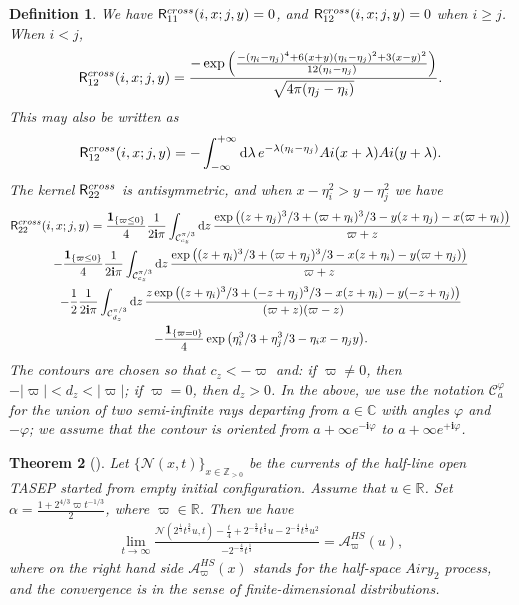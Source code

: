 \documentclass[12pt,a4paper]{amsart}
\newtheorem{theorem}{Theorem} %
\newtheorem{definition}[theorem]{Definition}
\theoremstyle{remark}
\numberwithin{equation}{section} \numberwithin{theorem}{section}
\newcommand{\Rkernel}{\mathsf{R}}
\newcommand{\I}{\ensuremath{\mathbf{i}}}
\def \Ai {{\rm Ai}}
\begin{document}
\begin{definition}
We have
$\Rkernel_{11}^{\rm cross}(i,x;j,y)=0$, and
$\Rkernel_{12}^{\rm cross}(i,x;j,y)=0$ when $i\geq j$.
When $i<j$,
$$
\Rkernel_{12}^{\rm cross}(i,x;j,y)
=
\frac{-\exp\left(
\frac{
-(\eta_i-\eta_j)^4
+6(x+y)(\eta_i-\eta_j)^2
+3(x-y)^2
}{
12(\eta_i-\eta_j)
}
\right)}
{\sqrt{4\pi(\eta_j-\eta_i)}}.
$$
This may also be written as
$$
\Rkernel_{12}^{\rm cross}(i,x;j,y)
=
-\int_{-\infty}^{+\infty}
\mathrm{d}\lambda\,
e^{-\lambda(\eta_i-\eta_j)}
\Ai(x+\lambda)\Ai(y+\lambda).
$$
The kernel $\Rkernel_{22}^{\rm cross}$ is antisymmetric, and when
$x-\eta_i^2>y-\eta_j^2$ we have
\begin{multline*}
\Rkernel_{22}^{\rm cross}(i,x;j,y)
=
\frac{\mathbf{1}_{\{\varpi\leq 0\}}}{4}
\frac{1}{2\I\pi}
\int_{\mathcal{C}_{c_z}^{\pi/3}}\mathrm{d}z\,
\frac{
\exp\big(
(z+\eta_j)^3/3+(\varpi+\eta_i)^3/3
-y(z+\eta_j)-x(\varpi+\eta_i)
\big)}
{\varpi+z}
\\
-\frac{\mathbf{1}_{\{\varpi\leq 0\}}}{4}
\frac{1}{2\I\pi}
\int_{\mathcal{C}_{c_z}^{\pi/3}}\mathrm{d}z\,
\frac{
\exp\big(
(z+\eta_i)^3/3+(\varpi+\eta_j)^3/3
-x(z+\eta_i)-y(\varpi+\eta_j)
\big)}
{\varpi+z}
\\
-\frac{1}{2}
\frac{1}{2\I\pi}
\int_{\mathcal{C}_{d_z}^{\pi/3}}\mathrm{d}z\,
\frac{
z\exp\big(
(z+\eta_i)^3/3+(-z+\eta_j)^3/3
-x(z+\eta_i)-y(-z+\eta_j)
\big)}
{(\varpi+z)(\varpi-z)}
\\
-\frac{\mathbf{1}_{\{\varpi=0\}}}{4}
\exp\big(
\eta_i^3/3+\eta_j^3/3-\eta_i x-\eta_j y
\big).
\end{multline*}
The contours are chosen so that $c_z<-\varpi$ and:
if $\varpi\neq0$, then
$-|\varpi|<d_z<|\varpi|$; if $\varpi=0$, then $d_z>0$.
In the above, we use the notation $\mathcal{C}_{a}^{\varphi}$ for
the union of two semi-infinite rays departing from
$a\in\mathbb{C}$ with angles $\varphi$ and $-\varphi$; we assume
that the contour is oriented from
$a+\infty e^{-\I\varphi}$ to
$a+\infty e^{+\I\varphi}$.
\end{definition}


\begin{theorem}[\cite{BBCS18a,BBCS18b}]
\label{thm:HS-A2}
Let $\{\mathcal{N}(x,t)\}_{x\in\mathbb{Z}_{>0}}$ be the currents of the half-line open TASEP started from empty initial configuration. 
Assume that $u \in \mathbb{R}$. Set $\alpha = \frac{1+2^{4/3}\varpi t^{-1/3}}{2}$, where $\varpi \in \mathbb{R}$. Then we have 
\begin{align}
\lim_{t\to \infty}\frac{\mathcal{N}(2^{\frac{1}{3}}t^{\frac{2}{3}}u, t)-\frac{t}{4}+2^{-\frac{2}{3}}t^{\frac{2}{3}}u-2^{-\frac{4}{3}}t^{\frac{1}{3}}u^2}{-2^{-\frac{4}{3}}t^{\frac{1}{3}}}=\mathcal{A}_{\varpi}^{HS}(u),
\end{align}
where on the right hand side $\mathcal{A}_{\varpi}^{HS}(x)$ stands for the half-space ${Airy}_2$ process, and the convergence is in the sense of finite-dimensional distributions.
\end{theorem}
\end{document}
